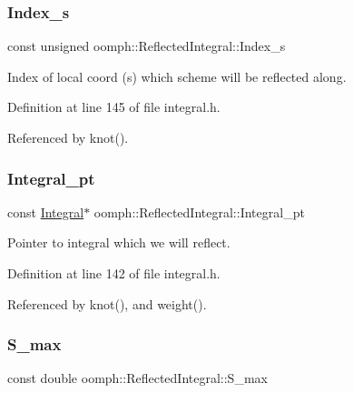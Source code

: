 \subsubsection{\texorpdfstring{Index\+\_\+s}{Index\_s}}
{\footnotesize\ttfamily const unsigned oomph\+::\+Reflected\+Integral\+::\+Index\+\_\+s\hspace{0.3cm}{\ttfamily [private]}}



Index of local coord (s) which scheme will be reflected along. 



Definition at line 145 of file integral.\+h.



Referenced by knot().

\mbox{\label{classoomph_1_1ReflectedIntegral_ae1f3c64912a966f525f1c731cf78f9ef}} 
\subsubsection{\texorpdfstring{Integral\+\_\+pt}{Integral\_pt}}
{\footnotesize\ttfamily const \hyperlink{classoomph_1_1Integral}{Integral}$\ast$ oomph\+::\+Reflected\+Integral\+::\+Integral\+\_\+pt\hspace{0.3cm}{\ttfamily [private]}}



Pointer to integral which we will reflect. 



Definition at line 142 of file integral.\+h.



Referenced by knot(), and weight().

\mbox{\label{classoomph_1_1ReflectedIntegral_a000d0b1a2ff6bdd496fa915f9949b39b}} 
\subsubsection{\texorpdfstring{S\+\_\+max}{S\_max}}
{\footnotesize\ttfamily const double oomph\+::\+Reflected\+Integral\+::\+S\+\_\+max\hspace{0.3cm}{\ttfamily [private]}}



